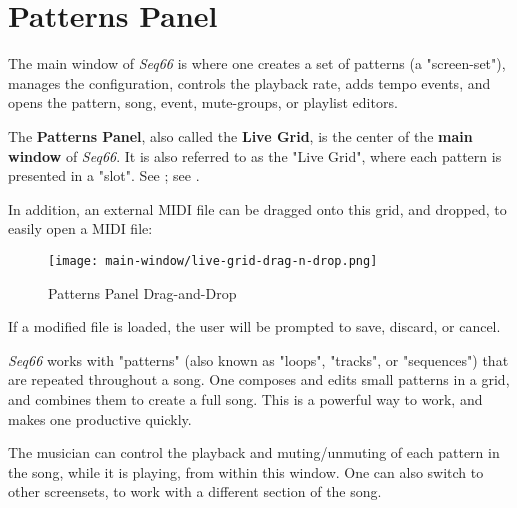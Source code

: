 %
%
%

\section{Patterns Panel}
\label{sec:patterns_panel}

   The main window of \textsl{Seq66} is
   where one creates a set of patterns (a "screen-set"),
   manages the configuration, controls the playback rate, adds tempo events,
   and opens the pattern, song, event, mute-groups, or playlist editors.

   The \textbf{Patterns Panel}, also called the \textbf{Live Grid},
   is the center of the
   \textbf{main window} of \textsl{Seq66}.
   It is also referred to as the "Live Grid", where each pattern is
   presented in a "slot".
   See ; see
   .

   In addition, an external MIDI file can be dragged onto this grid,
   and dropped, to easily open a MIDI file:

\begin{figure}[H]
   \centering 
   \texttt{[image: main-window/live-grid-drag-n-drop.png]}
   \caption{Patterns Panel Drag-and-Drop}
   \label{fig:patterns_panel_drag_n_drop}
\end{figure}

   If a modified file is loaded, the user
   will be prompted to save, discard, or cancel.

   \textsl{Seq66} works with "patterns" (also known as "loops", "tracks", or
   "sequences") that are repeated throughout a song.
   One composes and edits small patterns in a grid,
   and combines them to create a full song.
   This is a powerful way to work, and makes one productive quickly.

   The musician can
   control the playback and muting/unmuting of each pattern in
   the song, while it is playing, from within this window.
   One can also switch to other screensets, to work with a different
   section of the song.

